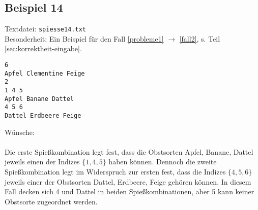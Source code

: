 \subsection{Beispiel 14}\label{example:14}
Textdatei: \texttt{spiesse14.txt}\\
Besonderheit: Ein Beispiel für den Fall \ref{probleme1} $\rightarrow$ \ref{fall2}, s. Teil \ref{sec:korrektheit-eingabe}.
\begin{verbatim}
6
Apfel Clementine Feige
2
1 4 5
Apfel Banane Dattel
4 5 6
Dattel Erdbeere Feige
\end{verbatim}

\noindent
Wünsche: \\

\noindent
{}\\

Die erste Spießkombination legt fest, dass die Obstsorten Apfel, Banane, Dattel
jeweils einen der Indizes $\{1, 4, 5\}$ haben können. Dennoch die zweite Spießkombination 
legt im Widerspruch zur ersten fest, dass die Indizes $\{4, 5, 6\}$ jeweils einer der
Obstsorten Dattel, Erdbeere, Feige gehören können. In diesem Fall decken sich 4 und Dattel
in beiden Spießkombinationen, aber 5 kann keiner Obstsorte zugeordnet werden.